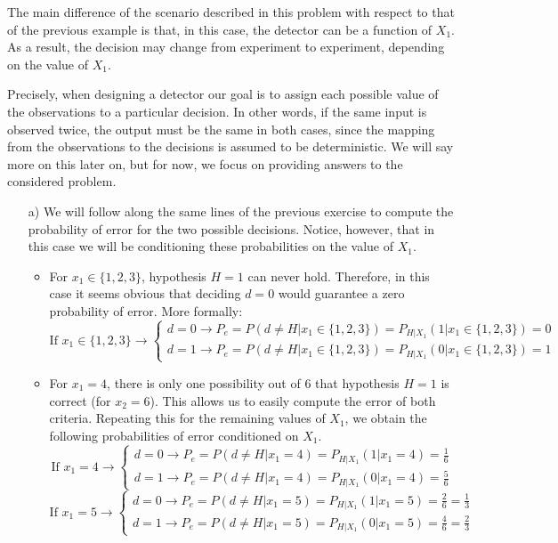 \begin{solution}
The main difference of the scenario described in this problem with respect to that of the previous example is that, in this case, the detector can be a function of $X_1$. As a result, the decision may change from experiment to experiment, depending on the value of  $X_1$.

Precisely, when designing a detector our goal is to assign each possible value of the observations to a particular decision. In other words, if the same input is observed twice, the output must be the same in both cases, since the mapping from the observations to the decisions is assumed to be deterministic. We will say more on this later on, but for now, we focus on providing answers to the considered problem.

\begin{itemize}
    \item [a)] We will follow along the same lines of the previous exercise to compute the probability of error for the two possible decisions. Notice, however, that in this case we will be conditioning these probabilities on the value of $X_1$.
    \begin{itemize}
        \item For $x_1 \in \{1,2,3\}$, hypothesis $H=1$ can never hold. Therefore, in this case it seems obvious that deciding $d=0$ would guarantee a zero probability of error. More formally:
        $$\text{If } x_1 \in \{1,2,3\} \rightarrow \left\{\begin{array}{l} d=0 \rightarrow P_e = P(d\neq H|x_1\in \{1,2,3\}) = P_{H|X_1}(1|x_1\in \{1,2,3\}) = 0 \\ d=1 \rightarrow P_e = P(d\neq H|x_1\in \{1,2,3\}) = P_{H|X_1}(0|x_1\in \{1,2,3\}) = 1\end{array}\right.$$
        \item For $x_1 = 4$, there is only one possibility out of 6 that hypothesis $H=1$ is correct (for $x_2=6$). This allows us to easily compute the error of both criteria. Repeating this  for the remaining values of $X_1$, we obtain the following probabilities of error conditioned on $X_1$.
        $$\text{If } x_1 =4 \rightarrow \left\{\begin{array}{l} d=0 \rightarrow P_e = P(d\neq H|x_1=4) = P_{H|X_1}(1|x_1=4) = \frac{1}{6} \\ d=1 \rightarrow P_e = P(d\neq H|x_1=4) = P_{H|X_1}(0|x_1=4) = \frac{5}{6}\end{array}\right.$$
        $$\text{If } x_1 =5 \rightarrow \left\{\begin{array}{l} d=0 \rightarrow P_e = P(d\neq H|x_1=5) = P_{H|X_1}(1|x_1=5) = \frac{2}{6} = \frac{1}{3}\\ d=1 \rightarrow P_e = P(d\neq H|x_1=5) = P_{H|X_1}(0|x_1=5) = \frac{4}{6} = \frac{2}{3}\end{array}\right.$$

\end{itemize}
\end{itemize}
\end{solution}
